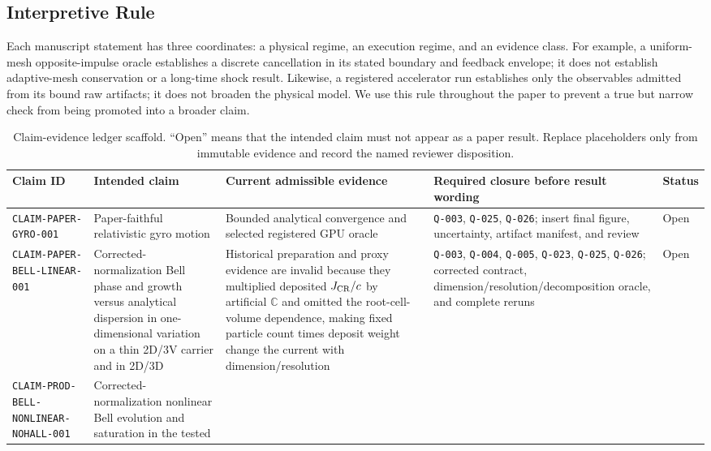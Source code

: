 \documentclass[twocolumn]{aastex701}
\newcommand{\claimid}[1]{\texttt{#1}}
\newcommand{\qgate}[1]{\texttt{#1}}
\begin{document}
\subsection{Interpretive Rule}

Each manuscript statement has three coordinates: a physical regime, an
execution regime, and an evidence class. For example, a uniform-mesh
opposite-impulse oracle establishes a discrete cancellation in its stated
boundary and feedback envelope; it does not establish adaptive-mesh
conservation or a long-time shock result. Likewise, a registered accelerator
run establishes only the observables admitted from its bound raw artifacts; it
does not broaden the physical model. We use this rule throughout the paper to
prevent a true but narrow check from being promoted into a broader claim.

\begin{table}[htbp]
\centering
\caption{Claim-evidence ledger scaffold. ``Open'' means that the intended claim
must not appear as a paper result. Replace placeholders only from immutable
evidence and record the named reviewer disposition.}
\label{tab:claim-evidence}
\small
\begin{tabular}{p{} p{} p{}
                p{} p{}}
\toprule
Claim ID & Intended claim & Current admissible evidence & Required closure
before result wording & Status \\
\midrule
\claimid{CLAIM-PAPER-GYRO-001} &
Paper-faithful relativistic gyro motion &
Bounded analytical convergence and selected registered GPU oracle &
\qgate{Q-003}, \qgate{Q-025}, \qgate{Q-026}; insert final figure, uncertainty,
artifact manifest, and review &
Open \\
\claimid{CLAIM-PAPER-BELL-LINEAR-001} &
Corrected-normalization Bell phase and growth versus analytical dispersion in
one-dimensional variation on a thin 2D/3V carrier and in 2D/3D &
Historical preparation and proxy evidence are invalid because they multiplied
deposited $J_{\rm CR}/c$ by artificial $\mathbb{C}$ and omitted the
root-cell-volume dependence, making fixed particle count times deposit weight
change the current with dimension/resolution &
\qgate{Q-003}, \qgate{Q-004}, \qgate{Q-005}, \qgate{Q-023},
\qgate{Q-025}, \qgate{Q-026}; corrected contract,
dimension/resolution/decomposition oracle, and complete reruns &
Open \\
\claimid{CLAIM-PROD-BELL-NONLINEAR-NOHALL-001} &
Corrected-normalization nonlinear Bell evolution and saturation in the tested

\end{tabular}
\end{table}
\end{document}
